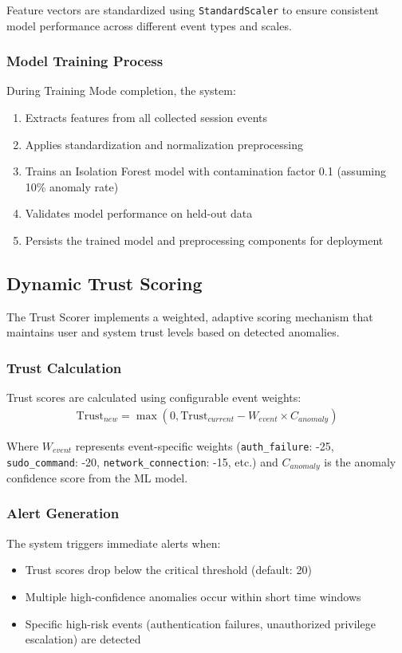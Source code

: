 \documentclass[conference]{IEEEtran}
\begin{document}
Feature vectors are standardized using \texttt{StandardScaler} to ensure consistent model performance across different event types and scales.

\subsubsection{Model Training Process}
During Training Mode completion, the system:
\begin{enumerate}
    \item Extracts features from all collected session events
    \item Applies standardization and normalization preprocessing
    \item Trains an Isolation Forest model with contamination factor 0.1 (assuming 10\% anomaly rate)
    \item Validates model performance on held-out data
    \item Persists the trained model and preprocessing components for deployment
\end{enumerate}

\subsection{Dynamic Trust Scoring}
The Trust Scorer implements a weighted, adaptive scoring mechanism that maintains user and system trust levels based on detected anomalies.

\subsubsection{Trust Calculation}
Trust scores are calculated using configurable event weights:
\begin{align}
\text{Trust}_{new} = \max(0, \text{Trust}_{current} - W_{event} \times C_{anomaly})
\end{align}

Where $W_{event}$ represents event-specific weights (\texttt{auth\_failure}: -25, \texttt{sudo\_command}: -20, \texttt{network\_connection}: -15, etc.) and $C_{anomaly}$ is the anomaly confidence score from the ML model.

\subsubsection{Alert Generation}
The system triggers immediate alerts when:
\begin{itemize}[leftmargin=*]
  \item Trust scores drop below the critical threshold (default: 20)
  \item Multiple high-confidence anomalies occur within short time windows
  \item Specific high-risk events (authentication failures, unauthorized privilege escalation) are detected
\end{itemize}
\end{document}
